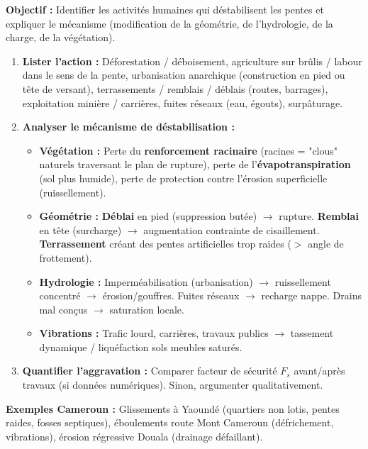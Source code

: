 \documentclass[11pt]{article}
\begin{document}
\begin{methode}
    \textbf{Objectif :} Identifier les activités humaines qui déstabilisent les pentes et expliquer le mécanisme (modification de la géométrie, de l'hydrologie, de la charge, de la végétation).
    \begin{enumerate}
        \item \textbf{Lister l'action :} Déforestation / déboisement, agriculture sur brûlis / labour dans le sens de la pente, urbanisation anarchique (construction en pied ou tête de versant), terrassements / remblais / déblais (routes, barrages), exploitation minière / carrières, fuites réseaux (eau, égouts), surpâturage.
        \item \textbf{Analyser le mécanisme de déstabilisation :}
            \begin{itemize}
                \item \textbf{Végétation :} Perte du \textbf{renforcement racinaire} (racines = "clous" naturels traversant le plan de rupture), perte de l'\textbf{évapotranspiration} (sol plus humide), perte de protection contre l'érosion superficielle (ruissellement).
                \item \textbf{Géométrie :} \textbf{Déblai} en pied (suppression butée) $\rightarrow$ rupture. \textbf{Remblai} en tête (surcharge) $\rightarrow$ augmentation contrainte de cisaillement. \textbf{Terrassement} créant des pentes artificielles trop raides ($>$ angle de frottement).
                \item \textbf{Hydrologie :} Imperméabilisation (urbanisation) $\rightarrow$ ruissellement concentré $\rightarrow$ érosion/gouffres. Fuites réseaux $\rightarrow$ recharge nappe. Drains mal conçus $\rightarrow$ saturation locale.
                \item \textbf{Vibrations :} Trafic lourd, carrières, travaux publics $\rightarrow$ tassement dynamique / liquéfaction sols meubles saturés.
            \end{itemize}
        \item \textbf{Quantifier l'aggravation :} Comparer facteur de sécurité $F_s$ avant/après travaux (si données numériques). Sinon, argumenter qualitativement.
    \end{enumerate}
    \textbf{Exemples Cameroun :} Glissements à Yaoundé (quartiers non lotis, pentes raides, fosses septiques), éboulements route Mont Cameroun (défrichement, vibrations), érosion régressive Douala (drainage défaillant).
\end{methode}
\end{document}
